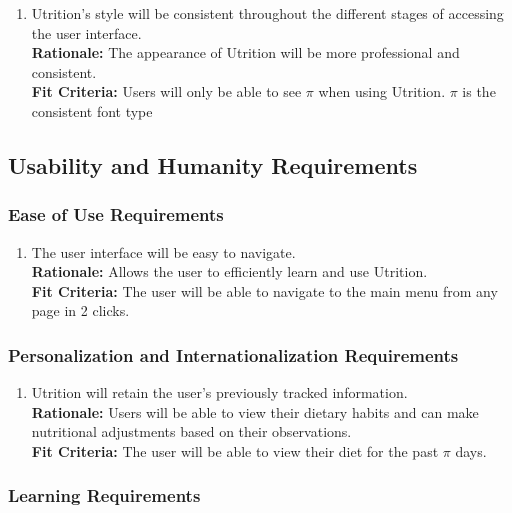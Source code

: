 \documentclass[12pt]{article}
\begin{document}
\begin{enumerate}[{LF}2. ]
	\item Utrition’s style will be consistent throughout the different stages of accessing the user interface.\\
	\textbf{Rationale:} The appearance of Utrition will be more professional and consistent. \\
	\textbf{Fit Criteria:} Users will only be able to see $\pi$ when using Utrition. $\pi$ is the consistent font type
\end{enumerate}

\subsection{Usability and Humanity Requirements}

\subsubsection{Ease of Use Requirements}

\begin{enumerate}[{UH}1. ]
	\item The user interface will be easy to navigate. \\
	\textbf{Rationale:} Allows the user to efficiently learn and use Utrition.\\
	\textbf{Fit Criteria:} The user will be able to navigate to the main menu from any page in 2 clicks.
\end{enumerate}

\subsubsection{Personalization and Internationalization Requirements}

\begin{enumerate}[{UH}2. ] 
	\item Utrition will retain the user’s previously tracked information.\\
	\textbf{Rationale:} Users will be able to view their dietary habits and can make nutritional adjustments based on their observations.\\
	\textbf{Fit Criteria:} The user will be able to view their diet for the past $\pi$ days.
	
\end{enumerate}

\subsubsection{Learning Requirements}
\end{document}
